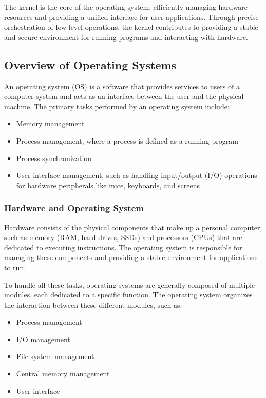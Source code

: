 The kernel is the core of the operating system, efficiently managing hardware resources and providing a unified interface for user applications. Through precise orchestration of low-level operations, the kernel contributes to providing a stable and secure environment for running programs and interacting with hardware.


\subsection{Overview of Operating Systems}

An operating system (OS) is a software that provides services to users of a computer system and acts as an interface between the user and the physical machine. The primary tasks performed by an operating system include:

\begin{itemize}
    \item Memory management
    \item Process management, where a process is defined as a running program
    \item Process synchronization
    \item User interface management, such as handling input/output (I/O) operations for hardware peripherals like mice, keyboards, and screens
\end{itemize}


\subsubsection{Hardware and Operating System}
Hardware consists of the physical components that make up a personal computer, such as memory (RAM, hard drives, SSDs) and processors (CPUs) that are dedicated to executing instructions. The operating system is responsible for managing these components and providing a stable environment for applications to run.

To handle all these tasks, operating systems are generally composed of multiple modules, each dedicated to a specific function. The operating system organizes the interaction between these different modules, such as:

\begin{itemize}
    \item Process management
    \item I/O management
    \item File system management
    \item Central memory management
    \item User interface
\end{itemize}

